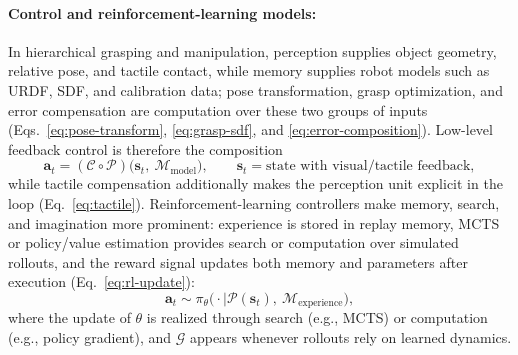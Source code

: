 \documentclass[12pt,a4paper]{article}
\newcommand{\Per}{\mathcal{P}}
\newcommand{\Mem}{\mathcal{M}}
\newcommand{\Comp}{\mathcal{C}}
\newcommand{\Imag}{\mathcal{G}}
\begin{document}
\paragraph{Control and reinforcement-learning models:}
In hierarchical grasping and manipulation, perception supplies object geometry, relative pose, and tactile contact, while memory supplies robot models such as URDF, SDF, and calibration data; pose transformation, grasp optimization, and error compensation are computation over these two groups of inputs (Eqs.~\eqref{eq:pose-transform}, \eqref{eq:grasp-sdf}, and \eqref{eq:error-composition}). Low-level feedback control is therefore the composition
\begin{equation}
\mathbf{a}_{t}=(\Comp\circ\Per)\bigl(\mathbf{s}_{t},\ \Mem_{\mathrm{model}}\bigr),\qquad
\mathbf{s}_{t}=\text{state with visual/tactile feedback},
\label{eq:summary-control}
\end{equation}
while tactile compensation additionally makes the perception unit explicit in the loop (Eq.~\eqref{eq:tactile}). Reinforcement-learning controllers make memory, search, and imagination more prominent: experience is stored in replay memory, MCTS or policy/value estimation provides search or computation over simulated rollouts, and the reward signal updates both memory and parameters after execution (Eq.~\eqref{eq:rl-update}):
\begin{equation}
\mathbf{a}_{t}\sim\pi_{\theta}\bigl(\cdot\mid\Per(\mathbf{s}_{t}),\ \Mem_{\mathrm{experience}}\bigr),
\label{eq:summary-rl}
\end{equation}
where the update of $\theta$ is realized through search (e.g., MCTS) or computation (e.g., policy gradient), and $\Imag$ appears whenever rollouts rely on learned dynamics.
\end{document}
